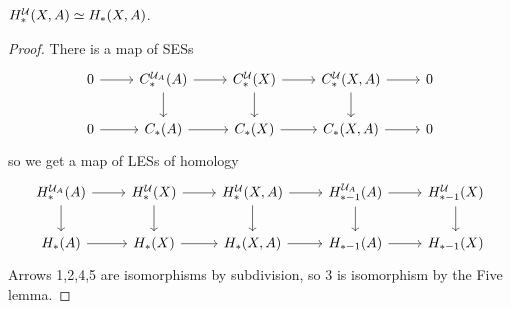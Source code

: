 \documentclass[a4paper,11pt]{article}
\begin{document}
				\begin{cor}\label{cor--excision}
					$H_\ast^\mathcal{U}(X,A)\simeq H_{\ast}(X,A)$.
				\end{cor}
				\begin{proof}
					There is a map of SESs
					\begin{equation*}
						\begin{tikzcd}
							0\ar[r]& C_\ast^{\mathcal{U}_A}(A)\ar[d]\ar[r]& C_\ast^\mathcal{U}(X)\ar[d]\ar[r]& C_\ast^\mathcal{U}(X,A)\ar[d]\ar[r]& 0\\
							0\ar[r]& \cx{A}\ar[r]& \cx{X}\ar[r]& \cx{X,A}\ar[r]& 0
						\end{tikzcd}
					\end{equation*}
					so we get a map of LESs of homology
					\begin{equation*}
						\begin{tikzcd}
							\shg{_A}{A}\ar[d]\ar[r]& \shg{}{X}\ar[d]\ar[r]& \shg{}{X,A}\ar[d]\ar[r]& \shg[\ast-1]{_A}{A}\ar[d]\ar[r]& \shg[\ast-1]{}{X}\ar[d]\\
							\hg{A}\ar[r]& \hg{X}\ar[r]& \hg{X,A}\ar[r]& \hg[\ast-1]{A}\ar[r]& \hg[\ast-1]{X}
						\end{tikzcd}
					\end{equation*}
					Arrows 1,2,4,5 are isomorphisms by subdivision, so 3 is isomorphism by the Five lemma.
				\end{proof}
\end{document}
